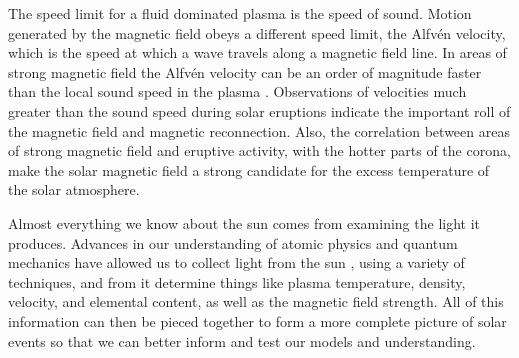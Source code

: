 The speed limit for a fluid dominated plasma is the speed of sound.
Motion generated by the magnetic field obeys a different speed limit, the Alfv\'en velocity, which is the speed at which a wave travels along a magnetic field line. 
In areas of strong magnetic field the Alfv\'en velocity can be an order of magnitude faster than the local sound speed in the plasma \citep{Priest2014}.
Observations of velocities much greater than the sound speed during solar eruptions indicate the important roll of the magnetic field and magnetic reconnection.
Also, the correlation between areas of strong magnetic field and eruptive activity, with the hotter parts of the corona, make the solar magnetic field a strong candidate for the excess temperature of the solar atmosphere.


Almost everything we know about the sun comes from examining the light it produces. 
Advances in our understanding of atomic physics and quantum mechanics have allowed us to collect light from the sun , using a variety of techniques, and from it determine things like plasma temperature, density, velocity, and elemental content, as well as the magnetic field strength.
All of this information can then be pieced together to form a more complete picture of solar events so that we can better inform and test our models and understanding.

